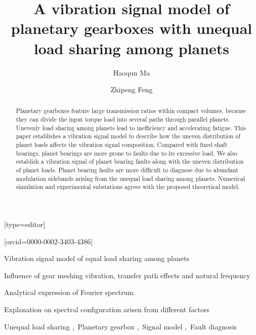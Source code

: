 \documentclass[a4paper,fleqn]{cas-sc}%
\begin{document}
\let\WriteBookmarks\relax
\def\floatpagepagefraction{1}
\def\textpagefraction{.001}
\title[mode = title]{A vibration signal model of planetary gearboxes with unequal load sharing among planets}
\author[1]{Haoqun Ma}[type=editor]
\address[1]{University of Science and Technology Beijing, No.30, Xueyuan Road, Haidian District, Beijing.}
\author[1]{Zhipeng Feng}[orcid=0000-0002-3403-4386]
\cormark[1]
%
%
% 
\begin{abstract}
    Planetary gearboxes feature large transmission ratios within compact volumes, because they can divide the input torque load into several paths through parallel planets. Unevenly load sharing among planets lead to inefficiency and accelerating fatigue. This paper establishes a vibration signal model to describe how the uneven distribution of planet loads affects the vibration signal composition. Compared with fixed shaft bearings, planet bearings are more prone to faults due to its excessive load. We also establish a vibration signal of planet bearing faults along with the uneven distribution of planet loads. Planet bearing faults are more difficult to diagnose due to abundant modulation sidebands arising from the unequal load sharing among planets. Numerical simulation and experimental substations agrees with the proposed theoretical model.
\end{abstract}
\begin{highlights}
    \item Vibration signal model of equal load sharing among planets
    \item Influence of gear meshing vibration, transfer path effects and natural frequency
    \item Analytical expression of Fourier spectrum 
    \item Explanation on spectral configuration arisen from different factors
\end{highlights}
\begin{keywords}
    Unequal load sharing \sep\ Planetary gearbox \sep\ Signal model \sep\ Fault diagnosis
\end{keywords}
    
\maketitle
\def\degree{${}^{\circ}$}
\end{document}
